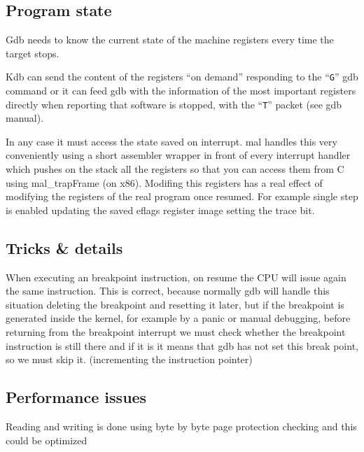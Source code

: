 \subsection{Program state}

Gdb needs to know the current state of the machine registers every time the target stops.

Kdb can send the content of the registers ``on demand'' responding to the ``\texttt{G}'' gdb command
or it can feed gdb with the information of the most important registers directly when reporting
that software is stopped, with the ``\texttt{T}'' packet (see gdb manual).

In any case it must access the state saved on interrupt. \textsf{mal} handles this
very conveniently using a short assembler wrapper in front of every interrupt handler
which pushes on the stack all the registers so that you can access them from C using
\textsf{mal\_trapFrame} (on x86). Modifing this registers has a real effect of modifying
the registers of the real program once resumed. For example single step is enabled
updating the saved \textsf{eflags} register image setting the \textsf{trace} bit.


\subsection{Tricks \& details}

When executing an breakpoint instruction, on resume the CPU will issue again the
same instruction. This is correct, because normally gdb will handle this situation
deleting the breakpoint and resetting it later, but if the breakpoint is generated
inside the kernel, for example by a panic or manual debugging, before returning
from the breakpoint interrupt we must check whether the breakpoint instruction is still
there and if it is it means that gdb has not set this break point, so we must skip it.
(incrementing the instruction pointer)

\subsection{Performance issues}

\todo

Reading and writing is done using byte by byte page protection checking and this could be optimized

